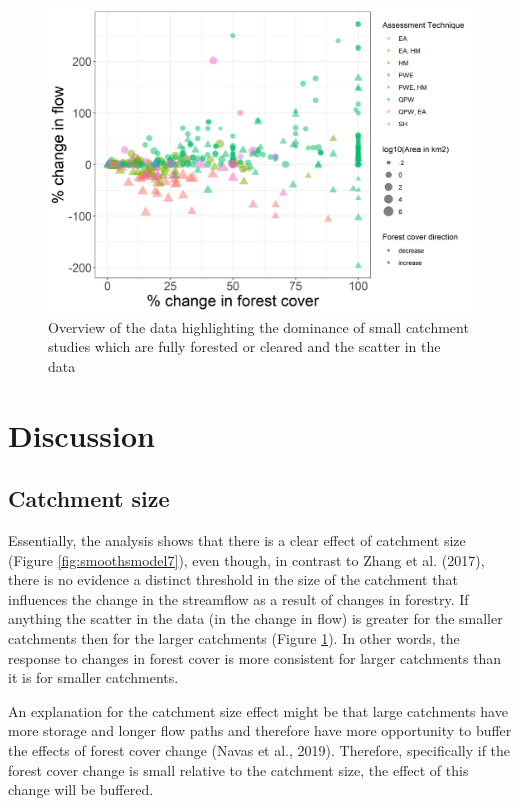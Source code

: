 \documentclass[]{elsarticle} %
\begin{document}
\begin{figure}
\includegraphics[width=0.9\linewidth]{flow_forest_byArea} \caption{Overview of the data highlighting the dominance of small catchment studies which are fully forested or cleared and the scatter in the data}\label{fig:overview}
\end{figure}

\hypertarget{discussion}{%
\section{Discussion}\label{discussion}}

\hypertarget{catchment-size}{%
\subsection{Catchment size}\label{catchment-size}}

Essentially, the analysis shows that there is a clear effect of catchment size (Figure \ref{fig:smoothsmodel7}), even though, in contrast to Zhang et al. (2017), there is no evidence a distinct threshold in the size of the catchment that influences the change in the streamflow as a result of changes in forestry. If anything the scatter in the data (in the change in flow) is greater for the smaller catchments then for the larger catchments (Figure \ref{fig:overview}). In other words, the response to changes in forest cover is more consistent for larger catchments than it is for smaller catchments.

An explanation for the catchment size effect might be that large catchments have more storage and longer flow paths and therefore have more opportunity to buffer the effects of forest cover change (Navas et al., 2019). Therefore, specifically if the forest cover change is small relative to the catchment size, the effect of this change will be buffered.
\end{document}
